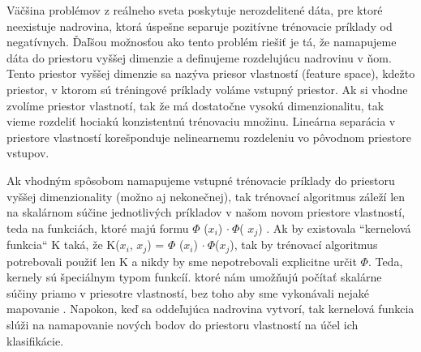 Väčšina problémov z reálneho sveta poskytuje nerozdelitené dáta, pre ktoré neexistuje nadrovina, ktorá úspešne separuje pozitívne trénovacie príklady od negatívnych. Ďaľšou možnosťou ako tento problém riešiť je tá, že namapujeme dáta do priestoru vyššej dimenzie a definujeme rozdelujúcu nadrovinu v ňom. Tento priestor vyššej dimenzie sa nazýva priesor vlastností (feature space), kdežto priestor, v ktorom sú tréningové príklady voláme vstupný priestor. 
Ak si vhodne zvolíme priestor vlastnotí, tak že má dostatočne vysokú dimenzionalitu, tak vieme rozdeliť hociakú konzistentnú trénovaciu množinu. Lineárna separácia v priestore vlastností korešponduje nelinearnemu rozdeleniu vo pôvodnom priestore vstupov.\par
Ak vhodným spôsobom namapujeme vstupné trénovacie príklady do priestoru vyššej dimenzionality (možno aj nekonečnej), tak trénovací algoritmus záleží len na skalárnom súčine jednotlivých príkladov v našom novom priestore vlastností, teda na funkciách, ktoré majú formu $ \Phi$ (\textit{$x_i$}) $\cdot\ \Phi$( \textit{$x_j$}) . Ak by existovala ``kernelová funkcia`` K taká, že K(\textit{$x_i$}, \textit{$x_j$}) = $\Phi$ (\textit{$x_i$}) $\cdot\  \Phi$(\textit{$x_j$}), tak by trénovací algoritmus potrebovali použiť len K a nikdy by sme nepotrebovali explicitne určit $\Phi$. Teda, kernely sú špeciálnym typom funkcíí. ktoré nám umožňujú počítať skalárne súčiny priamo v priesotre vlastností, bez toho aby sme vykonávali nejaké mapovanie \cite{kernels}. Napokon, keď sa oddeľujúca nadrovina vytvorí, tak kernelová funkcia slúži na namapovanie nových bodov do priestoru vlastností na účel ich klasifikácie.
